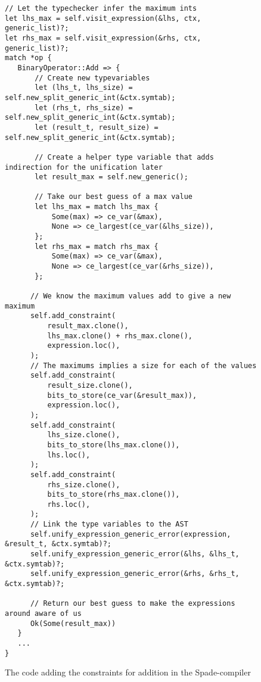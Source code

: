 \begin{figure}
\begin{verbatim}
// Let the typechecker infer the maximum ints 
let lhs_max = self.visit_expression(&lhs, ctx, generic_list)?;
let rhs_max = self.visit_expression(&rhs, ctx, generic_list)?;
match *op {
   BinaryOperator::Add => {
       // Create new typevariables
       let (lhs_t, lhs_size) = self.new_split_generic_int(&ctx.symtab);
       let (rhs_t, rhs_size) = self.new_split_generic_int(&ctx.symtab);
       let (result_t, result_size) = self.new_split_generic_int(&ctx.symtab);

       // Create a helper type variable that adds indirection for the unification later
       let result_max = self.new_generic();

       // Take our best guess of a max value
       let lhs_max = match lhs_max {
           Some(max) => ce_var(&max),
           None => ce_largest(ce_var(&lhs_size)),
       };
       let rhs_max = match rhs_max {
           Some(max) => ce_var(&max),
           None => ce_largest(ce_var(&rhs_size)),
       };

      // We know the maximum values add to give a new maximum
      self.add_constraint(
          result_max.clone(),
          lhs_max.clone() + rhs_max.clone(),
          expression.loc(),
      );
      // The maximums implies a size for each of the values
      self.add_constraint(
          result_size.clone(),
          bits_to_store(ce_var(&result_max)),
          expression.loc(),
      );
      self.add_constraint(
          lhs_size.clone(),
          bits_to_store(lhs_max.clone()),
          lhs.loc(),
      );
      self.add_constraint(
          rhs_size.clone(),
          bits_to_store(rhs_max.clone()),
          rhs.loc(),
      );
      // Link the type variables to the AST
      self.unify_expression_generic_error(expression, &result_t, &ctx.symtab)?;
      self.unify_expression_generic_error(&lhs, &lhs_t, &ctx.symtab)?;
      self.unify_expression_generic_error(&rhs, &rhs_t, &ctx.symtab)?;

      // Return our best guess to make the expressions around aware of us
      Ok(Some(result_max))
   }
   ...
}
\end{verbatim}
\caption{The code adding the constraints for addition in the Spade-compiler}
\label{fig:BinaryExpression}
\end{figure}

